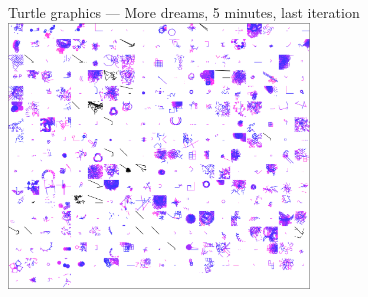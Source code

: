 \documentclass{beamer}
\begin{document}
\begin{frame}{Turtle graphics --- More dreams, 5 minutes, last iteration}
  \centering
  \includegraphics[width=8cm]{figures/dreams/5m_final.eps}
\end{frame}
\end{document}
